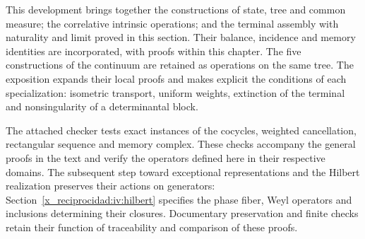 This development brings together the constructions of state, tree and common measure; the correlative intrinsic operations; and the terminal assembly with naturality and limit proved in this section. Their balance, incidence and memory identities are incorporated, with proofs within this chapter. The five constructions of the continuum are retained as operations on the same tree. The exposition expands their local proofs and makes explicit the conditions of each specialization: isometric transport, uniform weights, extinction of the terminal and nonsingularity of a determinantal block.

The attached checker tests exact instances of the cocycles, weighted cancellation, rectangular sequence and memory complex. These checks accompany the general proofs in the text and verify the operators defined here in their respective domains. The subsequent step toward exceptional representations and the Hilbert realization preserves their actions on generators: Section~\ref{x_reciprocidad:iv:hilbert} specifies the phase fiber, Weyl operators and inclusions determining their closures. Documentary preservation and finite checks retain their function of traceability and comparison of these proofs.
